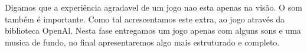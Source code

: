 Digamos que a experiência agradavel de um jogo nao esta apenas na visão. O som também é importante. Como tal acrescentamos este extra, ao jogo através da biblioteca OpenAl. Nesta fase entregamos um jogo apenas com alguns sons e uma musica de fundo, no final apresentaremos algo mais estruturado e completo.
